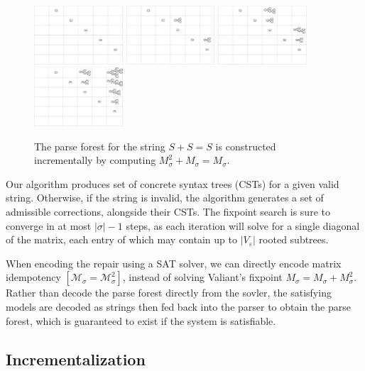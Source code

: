 \documentclass[sigplan,review,anonymous,acmsmall]{acmart}\settopmatter{printfolios=false,printccs=false,printacmref=false}
\begin{document}
\begin{figure}[H]
    \includegraphics[width=3.305cm]{../figures/parse1.png}
    \includegraphics[width=3.298cm]{../figures/parse2.png}
    \includegraphics[width=3.3cm]{../figures/parse3.png}
    \includegraphics[width=3.32cm]{../figures/parse4.png}
  \caption{The parse forest for the string $S + S = S$ is constructed incrementally by computing $M_\sigma^2 + M_\sigma = M_\sigma$.}
\end{figure}

Our algorithm produces set of concrete syntax trees (CSTs) for a given valid string. Otherwise, if the string is invalid, the algorithm generates a set of admissible corrections, alongside their CSTs. The fixpoint search is sure to converge in at most $|\sigma| - 1$ steps, as each iteration will solve for a single diagonal of the matrix, each entry of which may contain up to $|V_\varepsilon|$ rooted subtrees.

When encoding the repair using a SAT solver, we can directly encode matrix idempotency $[\mathcal{M}_\sigma=\mathcal{M}_\sigma^2]$, instead of solving Valiant's fixpoint $M_\sigma = M_\sigma + M^2_\sigma$. Rather than decode the parse forest directly from the sovler, the satisfying models are decoded as strings then fed back into the parser to obtain the parse forest, which is guaranteed to exist if the system is satisfiable.

\pagebreak\subsection{Incrementalization}\label{sec:incrementalization}
\end{document}
